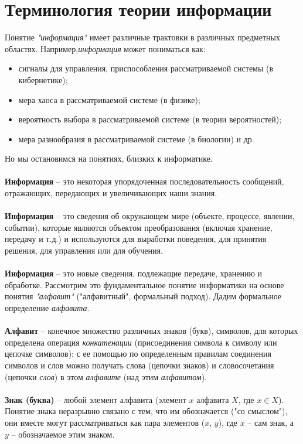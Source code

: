 \section{Терминология теории информации}

Понятие \textit{"информация"} имеет различные трактовки в различных предметных областях. Например,\textit{информация} может пониматься как:
\begin{itemize}
\item сигналы для управления, приспособления рассматриваемой системы (в кибернетике);
\item мера хаоса в рассматриваемой системе (в физике);
\item вероятность выбора в рассматриваемой системе (в теории вероятностей);
\item мера разнообразия в рассматриваемой системе (в биологии) и др.
\end{itemize}
 Но мы остановимся на понятиях, близких к информатике.
\\
\\\textbf{Информация} -- это некоторая упорядоченная последовательность сообщений, отражающих, передающих и увеличивающих наши знания.
\\
\\\textbf{Информация} -- это сведения об окружающем мире (объекте, процессе, явлении, событии), которые являются объектом преобразования (включая хранение, передачу и т.д.) и используются для выработки поведения, для принятия решения, для управления или для обучения.
\\
\\\textbf{Информация} -- это новые сведения, подлежащие передаче, хранению и обработке.
\newpage 
Рассмотрим это фундаментальное понятие информатики на основе понятия \textit{"алфавит"} ("алфавитный", формальный подход). Дадим формальное определение \textit{алфавита}.
\\
\\\textbf{Алфавит} -- конечное множество различных знаков (букв), символов, для которых определена операция \emph{конкатенации} (присоединения символа к символу или цепочке символов); с ее помощью по определенным правилам соединения символов и слов можно получать слова (цепочки знаков) и словосочетания (цепочки \textit{слов}) в этом \textit{алфавите} (над этим \textit{алфавитом}).
\\
\\\textbf{Знак (буква)} -- любой элемент алфавита (элемент $x$ алфавита $X$, где $x \in X$). Понятие знака неразрывно связано с тем, что им обозначается ("со смыслом"), они вместе могут рассматриваться как пара элементов ($x$, $y$), где $x$ – сам знак, а $y$ – обозначаемое этим знаком.\\
